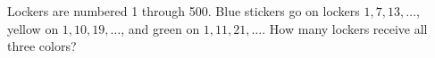 Lockers are numbered 1 through 500. Blue stickers go on lockers $1,7,13,\ldots$, yellow on $1,10,19,\ldots$, and green on $1,11,21,\ldots$. How many lockers receive all three colors?
